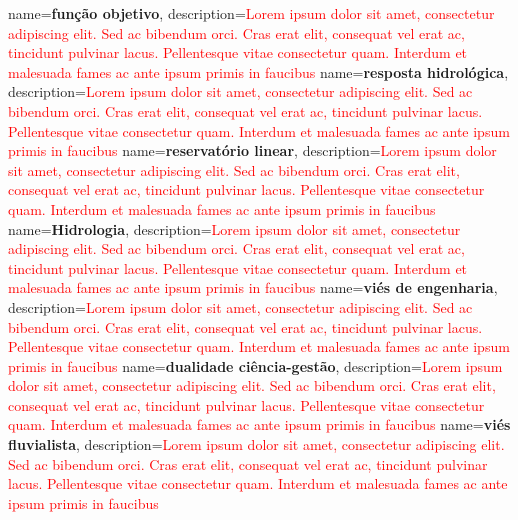 {
    name=\textbf{função objetivo},
    description={\textcolor{red}{Lorem ipsum dolor sit amet, consectetur adipiscing elit. Sed ac bibendum orci. Cras erat elit, consequat vel erat ac, tincidunt pulvinar lacus. Pellentesque vitae consectetur quam. Interdum et malesuada fames ac ante ipsum primis in faucibus}}
}
{
    name=\textbf{resposta hidrológica},
    description={\textcolor{red}{Lorem ipsum dolor sit amet, consectetur adipiscing elit. Sed ac bibendum orci. Cras erat elit, consequat vel erat ac, tincidunt pulvinar lacus. Pellentesque vitae consectetur quam. Interdum et malesuada fames ac ante ipsum primis in faucibus}}
}
{
    name=\textbf{reservatório linear},
    description={\textcolor{red}{Lorem ipsum dolor sit amet, consectetur adipiscing elit. Sed ac bibendum orci. Cras erat elit, consequat vel erat ac, tincidunt pulvinar lacus. Pellentesque vitae consectetur quam. Interdum et malesuada fames ac ante ipsum primis in faucibus}}
}
{
    name=\textbf{Hidrologia},
    description={\textcolor{red}{Lorem ipsum dolor sit amet, consectetur adipiscing elit. Sed ac bibendum orci. Cras erat elit, consequat vel erat ac, tincidunt pulvinar lacus. Pellentesque vitae consectetur quam. Interdum et malesuada fames ac ante ipsum primis in faucibus}}
}
{
    name=\textbf{viés de engenharia},
    description={\textcolor{red}{Lorem ipsum dolor sit amet, consectetur adipiscing elit. Sed ac bibendum orci. Cras erat elit, consequat vel erat ac, tincidunt pulvinar lacus. Pellentesque vitae consectetur quam. Interdum et malesuada fames ac ante ipsum primis in faucibus}}
}
{
    name=\textbf{dualidade ciência-gestão},
    description={\textcolor{red}{Lorem ipsum dolor sit amet, consectetur adipiscing elit. Sed ac bibendum orci. Cras erat elit, consequat vel erat ac, tincidunt pulvinar lacus. Pellentesque vitae consectetur quam. Interdum et malesuada fames ac ante ipsum primis in faucibus}}
}
{
    name=\textbf{viés fluvialista},
    description={\textcolor{red}{Lorem ipsum dolor sit amet, consectetur adipiscing elit. Sed ac bibendum orci. Cras erat elit, consequat vel erat ac, tincidunt pulvinar lacus. Pellentesque vitae consectetur quam. Interdum et malesuada fames ac ante ipsum primis in faucibus}}
}
